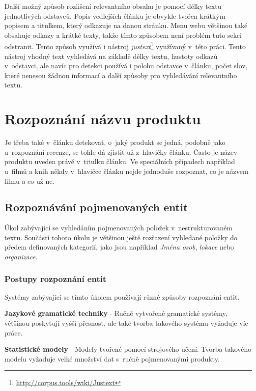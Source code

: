 Další možný způsob rozlišení relevantního obsahu je pomocí délky textu jednotlivých odstavců. Popis vedlejších článku je obvykle tvořen krátkým popisem a titulkem, který odkazuje na danou stránku. Menu webu většinou také obsahuje odkazy a krátké texty, takže tímto způsobem není problém tuto sekci odstranit. Tento způsob využívá i nástroj \textit{justext}\footnote{\url{http://corpus.tools/wiki/Justext}} využívaný v~této práci. Tento nástroj vhodný text vyhledává na základě délky textu, hustoty odkazů v~odstavci, ale navíc pro detekci používá i polohu odstavce v~článku, počet slov, které nenesou žádnou informací a další způsoby pro vyhledávání relevantního textu\cite{Pomikalek2011thesis}\cite{robinson2004ongoing}\cite{kohlschutter2010boilerplate}.

\section{Rozpoznání názvu produktu}
Je třeba také v~článku detekovat, o~jaký produkt se jedná, podobně jako u~rozpoznání recenze, se tohle dá zjistit už z~hlavičky článku. Často je název produktu uveden právě v~titulku článku. Ve speciálních případech například u~filmů a knih někdy v~hlavičce článku nejde jednoduše rozpoznat, co je názvem filmu a co už ne\cite{mansouri2008named}.

\subsection*{Rozpoznávání pojmenovaných entit}
Úkol zabývající se vyhledáním pojmenovaných položek v~nestrukturovaném textu. Součástí tohoto úkolu je většinou ještě rozřazení vyhledané položky do předem definovaných kategorií, jako jsou například \textit{Jména osob}, \textit{lokace} nebo \textit{organizace}\cite{FSIMT101611}\cite{Suss2019thesis}.

\subsubsection*{Postupy rozpoznání entit}
Systémy zabývající se tímto úkolem používají různé způsoby rozpoznání entit\cite{FSIMT101611}.

\textbf{Jazykové gramatické techniky} - Ručně vytvořené gramatické systémy, většinou poskytují vyšší přesnost, ale také tvorba takového systému vyžaduje víc práce.

\textbf{Statistické modely} - Modely tvořené pomocí strojového učení. Tvorba takového modelu vyžaduje velké množství dat s~ručně pojmenovanými produkty.


